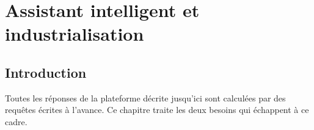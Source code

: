 %
%
%
%

\providecommand{\captureAPlacer}[2]{%
  \fbox{\begin{minipage}[c][#1][c]{0.82\linewidth}%
    \centering\small\itshape Capture à insérer : \texttt{#2}%
  \end{minipage}}%
}

\chapter{Assistant intelligent et industrialisation}

\section{Introduction}

Toutes les réponses de la plateforme décrite jusqu'ici sont calculées par des
requêtes écrites à l'avance. Ce chapitre traite les deux besoins qui échappent
à ce cadre.

